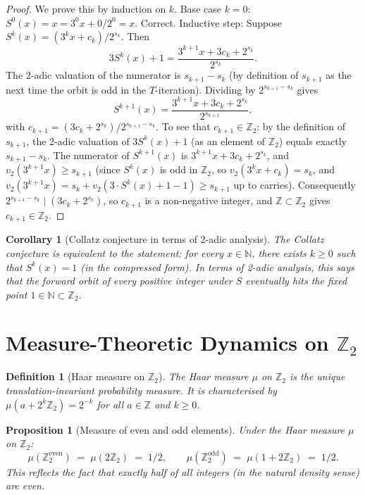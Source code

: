 \documentclass[12pt,a4paper]{article}
\newtheorem{proposition}[theorem]{Proposition}
\newtheorem{corollary}[theorem]{Corollary}
\newtheorem{definition}[theorem]{Definition}
\begin{document}
\begin{proof}
We prove this by induction on $k$.
Base case $k=0$: $S^0(x) = x = 3^0 x + 0 / 2^0 = x$. Correct.
Inductive step: Suppose $S^k(x) = (3^k x + c_k)/2^{s_k}$. Then
\[
  3 S^k(x) + 1 = \frac{3^{k+1} x + 3c_k + 2^{s_k}}{2^{s_k}}.
\]
The 2-adic valuation of the numerator is $s_{k+1} - s_k$ (by definition of $s_{k+1}$
as the next time the orbit is odd in the $T$-iteration). Dividing by $2^{s_{k+1}-s_k}$ gives
\[
  S^{k+1}(x) = \frac{3^{k+1} x + 3c_k + 2^{s_k}}{2^{s_{k+1}}},
\]
with $c_{k+1} = (3c_k + 2^{s_k})/2^{s_{k+1}-s_k}$.
To see that $c_{k+1} \in \mathbb{Z}_2$: by the definition of $s_{k+1}$,
the 2-adic valuation of $3S^k(x)+1$ (as an element of $\mathbb{Z}_2$)
equals exactly $s_{k+1} - s_k$.  The numerator of $S^{k+1}(x)$ is
$3^{k+1}x + 3c_k + 2^{s_k}$, and $v_2(3^{k+1}x) \geq s_{k+1}$ (since
$S^k(x)$ is odd in $\mathbb{Z}_2$, so $v_2(3^k x + c_k) = s_k$, and
$v_2(3^{k+1}x) = s_k + v_2(3\cdot S^k(x) + 1 - 1) \geq s_{k+1}$ up to
carries).  Consequently $2^{s_{k+1}-s_k} \mid (3c_k + 2^{s_k})$, so
$c_{k+1}$ is a non-negative integer, and $\mathbb{Z} \subset \mathbb{Z}_2$
gives $c_{k+1} \in \mathbb{Z}_2$.
\end{proof}

\begin{corollary}[Collatz conjecture in terms of 2-adic analysis]\label{cor:2adic_reformulation}
The Collatz conjecture is equivalent to the statement: for every $x \in \mathbb{N}$,
there exists $k \geq 0$ such that $S^k(x) = 1$ (in the compressed form). In terms of
2-adic analysis, this says that the forward orbit of every positive integer under $S$
eventually hits the fixed point $1 \in \mathbb{N} \subset \mathbb{Z}_2$.
\end{corollary}

\section{Measure-Theoretic Dynamics on $\mathbb{Z}_2$}\label{sec:dynamics}

\begin{definition}[Haar measure on $\mathbb{Z}_2$]\label{def:haar}
The \emph{Haar measure} $\mu$ on $\mathbb{Z}_2$ is the unique translation-invariant
probability measure. It is characterised by $\mu(a + 2^k \mathbb{Z}_2) = 2^{-k}$ for
all $a \in \mathbb{Z}$ and $k \geq 0$.
\end{definition}

\begin{proposition}[Measure of even and odd elements]\label{prop:measure_parity}
Under the Haar measure $\mu$ on $\mathbb{Z}_2$:
\[
  \mu(\mathbb{Z}_2^{\text{even}}) \;=\; \mu(2\mathbb{Z}_2) \;=\; 1/2,
\qquad
  \mu(\mathbb{Z}_2^{\text{odd}}) \;=\; \mu(1 + 2\mathbb{Z}_2) \;=\; 1/2.
\]
This reflects the fact that exactly half of all integers (in the natural density sense)
are even.
\end{proposition}
\end{document}
